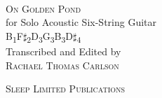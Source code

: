 \begin{titlepage}
    \begin{center}
        \vspace*{1.73cm}
        \textsc{}\\[3cm]
        \textsc{\Huge On Golden Pond}\\[.5cm]
        for Solo Acoustic Six-String Guitar\\
        B\textsubscript{1}F$\sharp$\textsubscript{2}D\textsubscript{3}G\textsubscript{3}B\textsubscript{3}D$\sharp$\textsubscript{4}\\[3cm]
        Transcribed and Edited by\\
        \textsc{Rachael Thomas Carlson}\\
        \date{}
        \vfill
        \textsc{Sleep Limited Publications}


    \end{center}

\end{titlepage}
